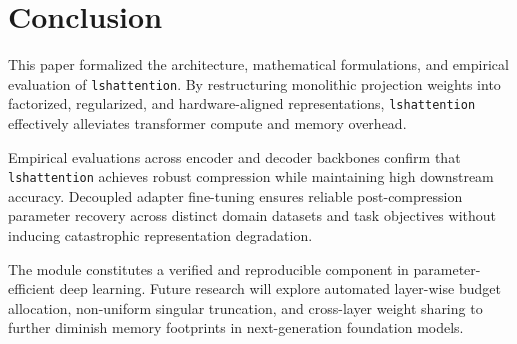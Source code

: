 \section{Conclusion}
This paper formalized the architecture, mathematical formulations, and empirical evaluation of \texttt{lshattention}. By restructuring monolithic projection weights into factorized, regularized, and hardware-aligned representations, \texttt{lshattention} effectively alleviates transformer compute and memory overhead.

Empirical evaluations across encoder and decoder backbones confirm that \texttt{lshattention} achieves robust compression while maintaining high downstream accuracy. Decoupled adapter fine-tuning ensures reliable post-compression parameter recovery across distinct domain datasets and task objectives without inducing catastrophic representation degradation.

The module constitutes a verified and reproducible component in parameter-efficient deep learning. Future research will explore automated layer-wise budget allocation, non-uniform singular truncation, and cross-layer weight sharing to further diminish memory footprints in next-generation foundation models.
